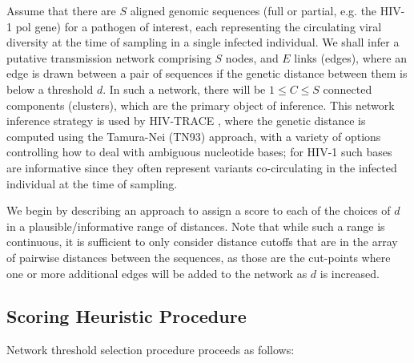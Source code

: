 \documentclass[utf8]{FrontiersinHarvard} %
\begin{document}
Assume that there are $S$ aligned genomic sequences (full or partial, e.g. the
HIV-1 pol gene) for a pathogen of interest, each representing the circulating
viral diversity at the time of sampling in a single infected individual. We
shall infer a putative transmission network comprising $S$ nodes, and $E$ links
(edges), where an edge is drawn between a pair of sequences if the genetic
distance between them is below a threshold $d$. In such a network, there will
be $1\leq C \leq S$ connected components (clusters), which are the primary
object of inference. This network inference strategy is used by HIV-TRACE
\citep{kosakovsky_pond_hiv-trace_2018}, where the genetic distance is computed using the
Tamura-Nei (TN93) \citep{tamura_estimation_1993} approach, with a variety of options
controlling how to deal with ambiguous nucleotide bases; for HIV-1 such bases
are informative since they often represent variants co-circulating in the
infected individual at the time of sampling.

We begin by describing an approach to assign a score to each of the choices of
$d$ in a plausible/informative range of distances. Note that while such a range
is continuous, it is sufficient to only consider distance cutoffs that are in
the array of pairwise distances between the sequences, as those are the
cut-points where one or more additional edges will be added to the network as
$d$ is increased.

\subsection{Scoring Heuristic Procedure}

Network threshold selection procedure proceeds as follows:
\end{document}

